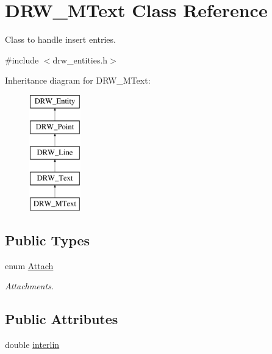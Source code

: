 \hypertarget{class_d_r_w___m_text}{}\section{D\+R\+W\+\_\+\+M\+Text Class Reference}
\label{class_d_r_w___m_text}


Class to handle insert entries.  




{\ttfamily \#include $<$drw\+\_\+entities.\+h$>$}

Inheritance diagram for D\+R\+W\+\_\+\+M\+Text\+:\begin{figure}[H]
\begin{center}
\leavevmode
\includegraphics[height=5.000000cm]{d3/d1a/class_d_r_w___m_text}
\end{center}
\end{figure}
\subsection*{Public Types}
\begin{DoxyCompactItemize}
\item 
\hypertarget{class_d_r_w___m_text_a19eb89e577ee3e259f52bc7aebf7b84c}{}enum \hyperlink{class_d_r_w___m_text_a19eb89e577ee3e259f52bc7aebf7b84c}{Attach} \label{class_d_r_w___m_text_a19eb89e577ee3e259f52bc7aebf7b84c}

\begin{DoxyCompactList}\small\item\em Attachments. \end{DoxyCompactList}\end{DoxyCompactItemize}
\subsection*{Public Attributes}
\begin{DoxyCompactItemize}
\item 
double \hyperlink{class_d_r_w___m_text_a60c7259ea36123406c5270dcd5434efa}{interlin}
\end{DoxyCompactItemize}

